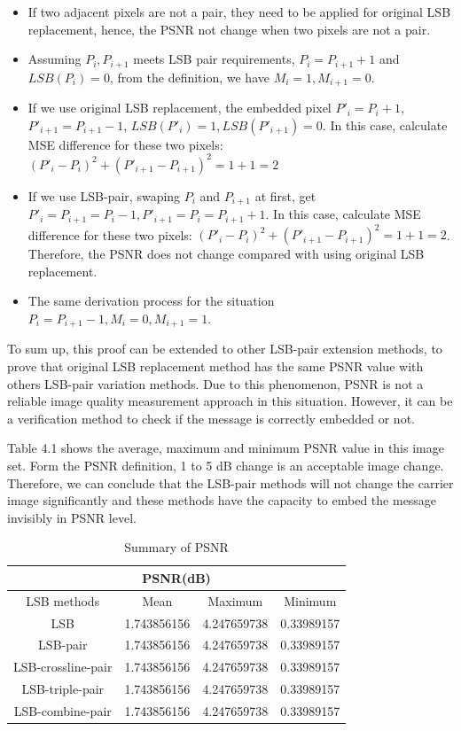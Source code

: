 \begin{itemize}
  \item If two adjacent pixels are not a pair, they need to be applied for original LSB replacement, hence, the PSNR not change when two pixels are not a pair.
  \item Assuming \(P_{i}, P_{i+1}\) meets LSB pair requirements, \(P_{i} = P_{i+1} + 1\) and \(LSB(P_{i}) = 0\), from the definition, we have \(M_{i} = 1, M_{i+1} = 0\).
  \item If we use original LSB replacement, the embedded pixel \(P'_{i} = P_{i} + 1\), \(P'_{i+1} = P_{i+1} - 1\), \(LSB(P'_{i}) = 1, LSB(P'_{i+1}) = 0\). In this case, calculate MSE difference for these two pixels: \((P'_{i} - P_{i})^2 + (P'_{i+1} - P_{i+1})^2 = 1 + 1 = 2\)
  \item If we use LSB-pair, swaping \(P_{i}\) and \(P_{i+1}\) at first, get \(P'_{i} = P_{i+1} = P_{i} - 1, P'_{i+1} = P_{i} = P_{i+1} + 1\). In this case, calculate MSE difference for these two pixels: \((P'_{i} - P_{i})^2 + (P'_{i+1} - P_{i+1})^2 = 1 + 1 = 2\). Therefore, the PSNR does not change compared with using original LSB replacement.
  \item The same derivation process for the situation \(P_{i} = P_{i+1} - 1, M_{i} = 0, M_{i+1} = 1\).
\end{itemize}

      
To sum up, this proof can be extended to other LSB-pair extension methods,  to prove that original LSB replacement method has the same PSNR value with others LSB-pair variation methods. Due to this phenomenon, PSNR  is not a reliable image quality measurement approach in this situation. However, it can be a verification method to check if the message is correctly embedded or not.


Table 4.1 shows the average, maximum and minimum PSNR value in this image set. Form the PSNR definition, 1 to 5 dB change is an acceptable image change. Therefore, we can conclude that the LSB-pair methods will not change the carrier image significantly and these methods have the capacity to embed the message invisibly in PSNR level.

\begin{table}
\begin{tabular}{ |c|c|c|c|  }
 \hline
 \multicolumn{4}{|c|}{PSNR(dB)} \\
 \hline
 LSB methods        &Mean           &Maximum        &Minimum\\
 \hline
 LSB                &1.743856156    &4.247659738    &0.33989157\\
 \hline
 LSB-pair           &1.743856156	&4.247659738	&0.33989157\\
 \hline
 LSB-crossline-pair &1.743856156    &4.247659738    &0.33989157\\
 \hline
 LSB-triple-pair    &1.743856156    &4.247659738    &0.33989157\\
 \hline
 LSB-combine-pair   &1.743856156    &4.247659738    &0.33989157\\
 \hline
\end{tabular}
 \caption{Summary of PSNR}
\end{table}

